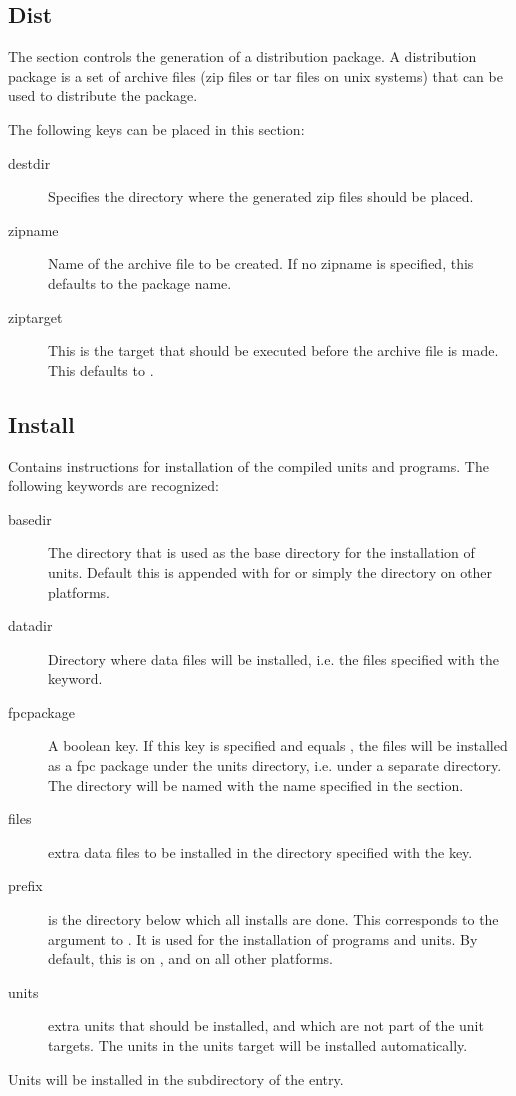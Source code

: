 \subsection{Dist}
The  section controls the generation of a distribution package. 
A distribution package is a set of archive files (zip files or tar files 
on unix systems) that can be used to distribute the package.

The following keys can be placed in this section:
\begin{description}
\item[destdir] Specifies the directory where the generated zip files should
be placed.
\item[zipname] Name of the archive file to be created. If no zipname is
specified, this defaults to the package name.
\item[ziptarget] This is the target that should be executed before the
archive file is made. This defaults to .
\end{description}

\subsection{Install}
Contains instructions for installation of the compiled units and programs. The
following keywords are recognized:
\begin{description}
\item[basedir]
The directory that is used as the base directory for the installation of
units. Default this is  appended with 
for \linux or simply the  directory on other platforms.
\item[datadir] Directory where data files will be installed, i.e. the files
specified with the  keyword.
\item[fpcpackage] A boolean key. If this key is specified and equals , 
the files will be installed as a fpc package under the \fpc units directory,
i.e. under a separate directory. The directory will be named with the name 
specified in the  section.
\item[files] extra data files to be installed in the directory specified
with the  key.
\item[prefix] is the directory below which all installs are done.
This corresponds to the  argument to \gnu {}.
It is used for the installation of programs and units. By default, this is
 on \linux, and  on all other platforms.
\item[units] extra units that should be installed, and which are not part of
the unit targets. The units in the units target will be installed
automatically.
\end{description}
Units will be installed in the subdirectory  
of the  entry.

